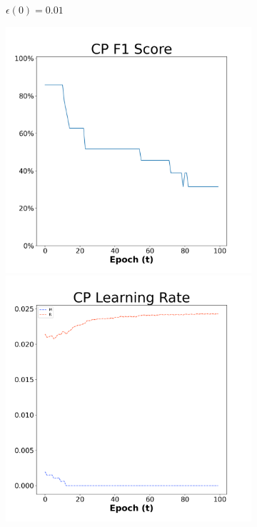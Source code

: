 \begin{figure}[H]
\begin{subfigure}{0.3\textwidth}
  \caption{$\epsilon(0)=0.01$}
\end{subfigure}\hfil %
\begin{subfigure}{0.3\textwidth}
  \includegraphics[width=\linewidth]{images/exper2/Sonar/CP_0.03_f1.png}
  \includegraphics[width=\linewidth]{images/exper2/Sonar/CP_0.03_lr.png}

\end{subfigure}
\end{figure}
